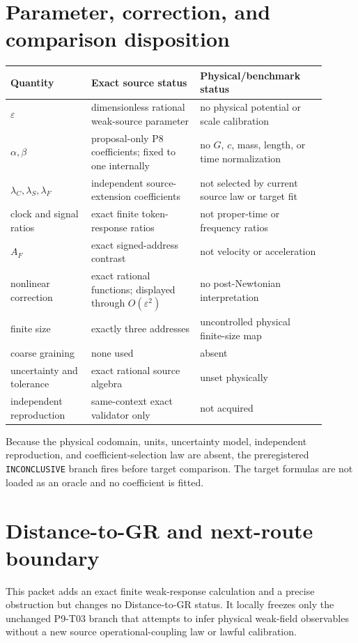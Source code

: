 \documentclass[11pt]{article}
\begin{document}
\section{Parameter, correction, and comparison disposition}

\begin{longtable}{p{0.23\linewidth}p{0.31\linewidth}p{0.36\linewidth}}
\toprule
Quantity & Exact source status & Physical/benchmark status\\
\midrule
\(\varepsilon\) & dimensionless rational weak-source parameter &
no physical potential or scale calibration\\
\(\alpha,\beta\) & proposal-only P8 coefficients; fixed to one internally &
no \(G\), \(c\), mass, length, or time normalization\\
\(\lambda_C,\lambda_S,\lambda_F\) & independent source-extension coefficients &
not selected by current source law or target fit\\
clock and signal ratios & exact finite token-response ratios &
not proper-time or frequency ratios\\
\(A_F\) & exact signed-address contrast &
not velocity or acceleration\\
nonlinear correction & exact rational functions; displayed through
\(O(\varepsilon^2)\) & no post-Newtonian interpretation\\
finite size & exactly three addresses & uncontrolled physical finite-size map\\
coarse graining & none used & absent\\
uncertainty and tolerance & exact rational source algebra & unset physically\\
independent reproduction & same-context exact validator only & not acquired\\
\bottomrule
\end{longtable}

Because the physical codomain, units, uncertainty model, independent
reproduction, and coefficient-selection law are absent, the preregistered
\texttt{INCONCLUSIVE} branch fires before target comparison.  The target
formulas are not loaded as an oracle and no coefficient is fitted.

\section{Distance-to-GR and next-route boundary}

This packet adds an exact finite weak-response calculation and a precise
obstruction but changes no Distance-to-GR status.  It locally freezes only the
unchanged P9-T03 branch that attempts to infer physical weak-field observables
without a new source operational-coupling law or lawful calibration.
\end{document}
